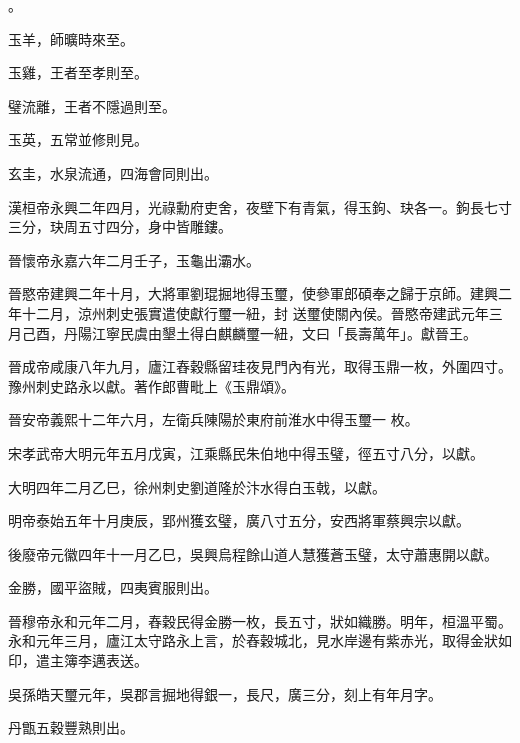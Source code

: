 \begin{pinyinscope}
 。


玉羊，師曠時來至。


玉雞，王者至孝則至。


璧流離，王者不隱過則至。


玉英，五常並修則見。


玄圭，水泉流通，四海會同則出。



 漢桓帝永興二年四月，光祿勳府吏舍，夜壁下有青氣，得玉鉤、玦各一。鉤長七寸三分，玦周五寸四分，身中皆雕鏤。



 晉懷帝永嘉六年二月壬子，玉龜出灞水。



 晉愍帝建興二年十月，大將軍劉琨掘地得玉璽，使參軍郎碩奉之歸于京師。建興二年十二月，涼州刺史張實遣使獻行璽一紐，封
 送璽使關內侯。晉愍帝建武元年三月己酉，丹陽江寧民虞由墾土得白麒麟璽一紐，文曰「長壽萬年」。獻晉王。



 晉成帝咸康八年九月，廬江舂穀縣留珪夜見門內有光，取得玉鼎一枚，外圍四寸。豫州刺史路永以獻。著作郎曹毗上《玉鼎頌》。



 晉安帝義熙十二年六月，左衛兵陳陽於東府前淮水中得玉璽一
 枚。



 宋孝武帝大明元年五月戊寅，江乘縣民朱伯地中得玉璧，徑五寸八分，以獻。



 大明四年二月乙巳，徐州刺史劉道隆於汴水得白玉戟，以獻。



 明帝泰始五年十月庚辰，郢州獲玄璧，廣八寸五分，安西將軍蔡興宗以獻。



 後廢帝元徽四年十一月乙巳，吳興烏程餘山道人慧獲蒼玉璧，太守蕭惠開以獻。



 金勝，國平盜賊，四夷賓服則出。



 晉穆帝永和元年二月，舂穀民得金勝一枚，長五寸，狀如織勝。明年，桓溫平蜀。永和元年三月，廬江太守路永上言，於舂穀城北，見水岸邊有紫赤光，取得金狀如印，遣主簿李邁表送。



 吳孫皓天璽元年，吳郡言掘地得銀一，長尺，廣三分，刻上有年月字。


丹甑五穀豐熟則出。




\end{pinyinscope}
